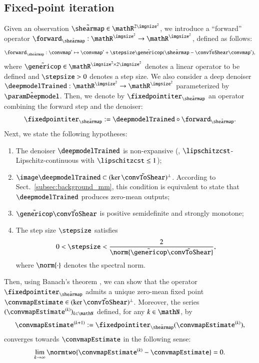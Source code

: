 \documentclass{aa}
\begin{document}
\subsection{Fixed-point iteration}
\label{subsec:pnp_fixedpoint}

Given an observation $\tilde\shearmap \in \mathR^{2\imgsize^2}$, we introduce a ``forward'' operator $\forward_{\tilde\shearmap}: \mathR^{\imgsize^2} \to \mathR^{\imgsize^2}$, defined as follows:
\begin{equation}
    \forward_{\tilde\shearmap}: \convmap' \mapsto \convmap' + \stepsize\tilde\genericop(\tilde\shearmap - \tilde\convToShear\convmap'),
\label{eq:forwardop}
\end{equation}
where $\tilde\genericop \in \mathR^{\imgsize^2 \times 2\imgsize^2}$ denotes a linear operator to be defined and $\stepsize > 0$ denotes a step size. We also consider a deep denoiser $\deepmodelTrained: \mathR^{\imgsize^2} \to \mathR^{\imgsize^2}$ parameterized by $\hat\paramDeepmodel$.
Then, we denote by $\fixedpointiter_{\tilde\shearmap}$ an operator combining the forward step and the denoiser:
\begin{equation}
    \fixedpointiter_{\tilde\shearmap} := \deepmodelTrained \circ \forward_{\tilde\shearmap}.
\label{eq:fixpointoperator}
\end{equation}
Next, we state the following hypotheses:
\begin{enumerate}
    \item The denoiser $\deepmodelTrained$ is non-expansive (\ie, $\lipschitzcst$-Lipschitz-continuous with $\lipschitzcst \leq 1$);
    \item $\image\deepmodelTrained \subset (\ker\tilde\convToShear)^\perp$. According to Sect.~\ref{subsec:background_mm}, this condition is equivalent to state that $\deepmodelTrained$ produces zero-mean outputs;
    \item $\tilde\genericop\tilde\convToShear$ is positive semidefinite and strongly monotone;
    \item The step size $\stepsize$ satisfies
    \begin{equation}
        0 < \stepsize < \frac{2}{\norm{\tilde\genericop\tilde\convToShear}},
    \label{eq:stepsize}
    \end{equation}
    where $\norm{\cdot}$ denotes the spectral norm.
\end{enumerate}
Then, using Banach's theorem \addref, we can show that the operator $\fixedpointiter_{\tilde\shearmap}$ admits a unique zero-mean fixed point $\convmapEstimate \in (\ker\tilde\convToShear)^\perp$. Moreover, the series $(\convmapEstimate^{(k)})_{k \in \mathN}$ defined, for any $k \in \mathN$, by
\begin{equation}
    \convmapEstimate^{(k+1)} := \fixedpointiter_{\tilde\shearmap}(\convmapEstimate^{(k)}),
\end{equation}
converges towards $\convmapEstimate$ in the following sense:
\begin{equation}
    \lim_{k \to \infty}\normtwo{\convmapEstimate^{(k)} - \convmapEstimate} = 0.
\end{equation}
\end{document}
